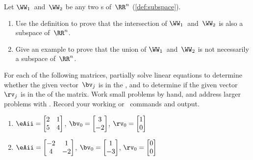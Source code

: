 \begin{exercise} \label{ex:} 
Let \(\WW_1\)\ and~\(\WW_2\) be any two s of~\(\RR^n\) (\autoref{def:subspace}).  
\begin{enumerate}
\item Use the definition to prove that the intersection of \(\WW_1\)\ and~\(\WW_2\) is also a subspace of~\(\RR^n\).
\item Give an example to prove that the union of \(\WW_1\)\ and~\(\WW_2\) is not necessarily a subspace of~\(\RR^n\).
\end{enumerate}
\end{exercise}





\begin{exercise} \label{ex:} 
For each of the following matrices, partially solve linear equations to determine whether the given vector~\(\bv_j\) is in the , and to determine if the given vector~\(\rv_j\) is in the  of the matrix.
Work small problems by hand, and address larger problems with \script.
Record your working or \script\ commands and output.
\begin{enumerate}
\item \(\eAii=\begin{bmatrix} 2&1
\\5&4 \end{bmatrix}\),
\(\bv_{\arabic{enumii}}=\begin{bmatrix} 3
\\-2 \end{bmatrix}\),
\(\rv_{\arabic{enumii}}=\begin{bmatrix} 1
\\0 \end{bmatrix}\)

\item \(\eAii=\begin{bmatrix} -2&1
\\4&-2 \end{bmatrix}\),
\(\bv_{\arabic{enumii}}=\begin{bmatrix} 1
\\-3 \end{bmatrix}\),
\(\rv_{\arabic{enumii}}=\begin{bmatrix} 0\\0 \end{bmatrix}\)


\end{enumerate}
\end{exercise}
